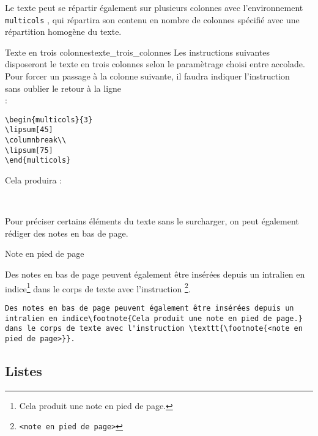 \documentclass[a4paper, 11pt, twoside, fleqn]{memoir}
\begin{document}
Le texte peut se répartir également sur plusieurs colonnes avec l'environnement \texttt{multicols} , qui répartira son contenu en nombre de colonnes spécifié avec une répartition homogène du texte.

\begin{exemple}{Texte en trois colonnes}{texte_trois_colonnes}
Les instructions suivantes disposeront le texte en trois colonnes selon le paramètrage choisi entre accolade. Pour forcer un passage à la colonne suivante, il faudra indiquer l'instruction \texttt{\columnbreak\\} sans oublier le retour à la ligne \texttt{\\} :
\begin{verbatim}
\begin{multicols}{3}
\lipsum[45]
\columnbreak\\
\lipsum[75]
\end{multicols}
\end{verbatim}

Cela produira :

\begin{multicols}{3}
\lipsum[45]
\columnbreak\\
\lipsum[75]
\end{multicols}
\end{exemple}

Pour préciser certains éléments du texte sans le surcharger, on peut également rédiger des notes en bas de page.

\begin{exemple}{Note en pied de page}{}
\begin{minipage}[t]{0.49\linewidth}
Des notes en bas de page peuvent également être insérées depuis un intralien en indice\footnote{Cela produit une note en pied de page.} dans le corps de texte avec l'instruction \texttt{\footnote{<note en pied de page>}}.
\end{minipage}
\hfill
\begin{minipage}[t]{0.49\linewidth}
\begin{verbatim}
Des notes en bas de page peuvent également être insérées depuis un intralien en indice\footnote{Cela produit une note en pied de page.} dans le corps de texte avec l'instruction \texttt{\footnote{<note en pied de page>}}.
\end{verbatim}
\end{minipage}
\end{exemple}


\subsection{Listes}
\end{document}
